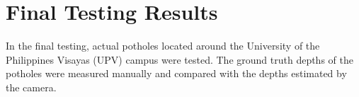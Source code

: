 \section{\textbf{ Final Testing Results} }
In the final testing, actual potholes located around the University of the Philippines Visayas (UPV) campus were tested. The ground truth depths of the potholes were measured manually and compared with the depths estimated by the camera.